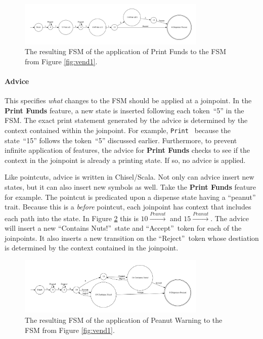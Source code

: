 \documentclass[sigplan,anonymous, review]{acmart}
\begin{document}
\begin{figure}
    \centering
    \includegraphics[width=0.8\textwidth]{figures/vend2.pdf}
    \caption{The resulting FSM of the application of Print Funds to the FSM from Figure \ref{fig:vend1}.}
    \label{fig:applyadvice}
\end{figure}

\paragraph{Advice} This specifies \emph{what} changes to the FSM should be applied at a joinpoint. In the \textbf{Print Funds} feature, a new state is inserted following each token~``5'' in the FSM. The exact print statement generated by the advice is determined by the context contained within the joinpoint. For example, \texttt{Print } because the state~``15'' follows the token~``5'' discussed earlier. Furthermore, to prevent infinite application of features, the advice for \textbf{Print Funds} checks to see if the context in the joinpoint is already a printing state. If so, no advice is applied.

Like pointcuts, advice is written in Chisel/Scala. Not only can advice insert new states, but it can also insert new symbols as well. Take the \textbf{Print Funds} feature for example. The pointcut is predicated upon a dispense state having a ``peanut'' trait. Because this is a \emph{before} pointcut, each joinpoint has context that includes each path into the state. In Figure \ref{fig:applyadvice2} this is $10 \xrightarrow{Peanut}$ and $15 \xrightarrow{Peanut}$. The advice will insert a new ``Contains Nuts!''~state and ``Accept''~token for each of the joinpoints. It also inserts a new transition on the ``Reject''~token whose destiation is determined by the context contained in the joinpoint.

\begin{figure}
    \centering
    \includegraphics[width=0.8\textwidth]{figures/vend3.pdf}
    \caption{The resulting FSM of the application of Peanut Warning to the FSM from Figure \ref{fig:vend1}.}
    \label{fig:applyadvice2}
\end{figure}
\end{document}
